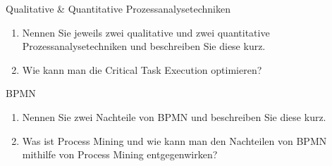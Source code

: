 \documentclass{article}
\begin{document}
\begin{exercise}{Qualitative \& Quantitative Prozessanalysetechniken}
  \begin{enumerate}
    \item Nennen Sie jeweils zwei qualitative und zwei quantitative Prozessanalysetechniken und beschreiben Sie diese kurz.
    \item Wie kann man die Critical Task Execution optimieren?
  \end{enumerate}

  \begin{solution}
  \end{solution}
\end{exercise}

\begin{exercise}{BPMN}
  \begin{enumerate}
    \item Nennen Sie zwei Nachteile von BPMN und beschreiben Sie diese kurz.
    \item Was ist Process Mining und wie kann man den Nachteilen von BPMN mithilfe von Process Mining entgegenwirken?
  \end{enumerate}

  \begin{solution}
  \end{solution}
\end{exercise}
\end{document}
